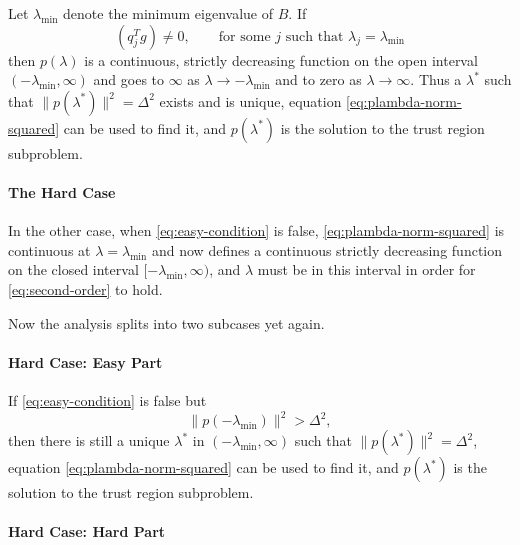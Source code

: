 \documentclass[11pt]{article}
\begin{document}
Let $\lambda_{\text{min}}$ denote the minimum eigenvalue of $B$.
If
\begin{equation} \label{eq:easy-condition}
   (q_j^T g) \neq 0, \qquad \text{for some $j$ such that
   $\lambda_j = \lambda_{\text{min}}$}
\end{equation}
then $p(\lambda)$ is a continuous, strictly decreasing function on
the open interval $(- \lambda_{\text{min}}, \infty)$ and goes to $\infty$
as $\lambda \to - \lambda_{\text{min}}$ and to zero as $\lambda \to \infty$.
Thus a $\lambda^*$
such that $\lVert p(\lambda^*) \rVert^2 = \Delta^2$ exists and is unique,
equation \eqref{eq:plambda-norm-squared} can be used to find it,
and $p(\lambda^*)$ is the
solution to the trust region subproblem.

\paragraph{The Hard Case}

In the other case, when \eqref{eq:easy-condition} is false,
\eqref{eq:plambda-norm-squared} is continuous
at $\lambda = \lambda_{\text{min}}$ and now 
defines a continuous
strictly decreasing function on
the closed interval $[- \lambda_{\text{min}}, \infty)$, and $\lambda$
must be in this interval in order for \eqref{eq:second-order} to hold.

Now the analysis splits into two subcases yet again.

\paragraph{Hard Case: Easy Part}

If \eqref{eq:easy-condition} is false but
\begin{equation} \label{eq:hard-easy-condition}
   \lVert p(- \lambda_{\text{min}}) \rVert^2 > \Delta^2,
\end{equation}
then there is still a unique $\lambda^*$ in $(- \lambda_{\text{min}}, \infty)$
such that $\lVert p(\lambda^*) \rVert^2 = \Delta^2$,
equation \eqref{eq:plambda-norm-squared} can be used to find it,
and $p(\lambda^*)$ is the
solution to the trust region subproblem.

\paragraph{Hard Case: Hard Part}
\end{document}
